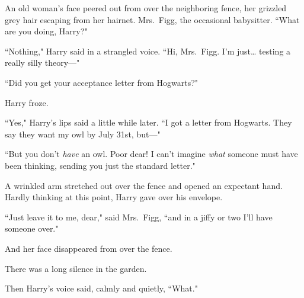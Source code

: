 An old woman's face peered out from over the neighboring fence, her grizzled grey hair escaping from her hairnet. Mrs.~Figg, the occasional babysitter. ``What are you doing, Harry?"

``Nothing," Harry said in a strangled voice. ``Hi, Mrs.~Figg. I'm just{\ldots} testing a really silly theory---"

``Did you get your acceptance letter from Hogwarts?"

Harry froze.

``Yes," Harry's lips said a little while later. ``I got a letter from Hogwarts. They say they want my owl by July 31st, but---"

``But you don't \emph{have} an owl. Poor dear! I can't imagine \emph{what} someone must have been thinking, sending you just the standard letter."

A wrinkled arm stretched out over the fence and opened an expectant hand. Hardly thinking at this point, Harry gave over his envelope.

``Just leave it to me, dear," said Mrs.~Figg, ``and in a jiffy or two I'll have someone over."

And her face disappeared from over the fence.

There was a long silence in the garden.

Then Harry's voice said, calmly and quietly, ``What."

